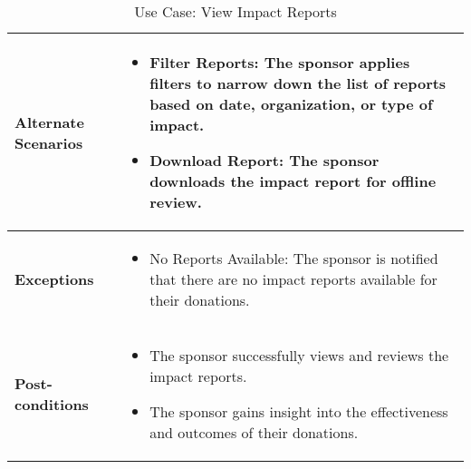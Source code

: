 \begin{table}[!ht]
\begin{tabularx}{\textwidth}{|l|X|}
        \hline
        \textbf{Alternate Scenarios} & 
        \begin{itemize}[label=--,itemsep=0pt]
            \item Filter Reports: The sponsor applies filters to narrow down the list of reports based on date, organization, or type of impact.
            \item Download Report: The sponsor downloads the impact report for offline review.
        \end{itemize} \\
        \hline
        \textbf{Exceptions} & 
        \begin{itemize}[label=--,itemsep=0pt]
            \item No Reports Available: The sponsor is notified that there are no impact reports available for their donations.
        \end{itemize} \\
        \hline
        \textbf{Post-conditions} & 
        \begin{itemize}[label=--,itemsep=0pt]
            \item The sponsor successfully views and reviews the impact reports.
            \item The sponsor gains insight into the effectiveness and outcomes of their donations.
        \end{itemize} \\
        \hline
    \end{tabularx}
    \caption{Use Case: View Impact Reports}
    \label{tab:use-case-register}
\end{table}

